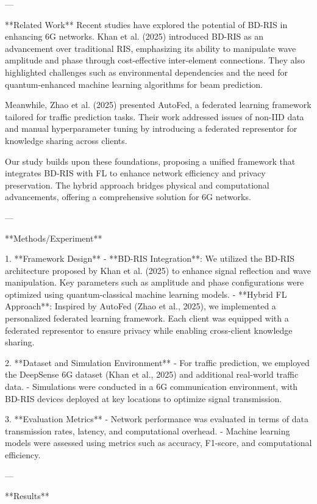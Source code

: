 ---

**Related Work**  
Recent studies have explored the potential of BD-RIS in enhancing 6G networks. Khan et al. (2025) introduced BD-RIS as an advancement over traditional RIS, emphasizing its ability to manipulate wave amplitude and phase through cost-effective inter-element connections. They also highlighted challenges such as environmental dependencies and the need for quantum-enhanced machine learning algorithms for beam prediction.  

Meanwhile, Zhao et al. (2025) presented AutoFed, a federated learning framework tailored for traffic prediction tasks. Their work addressed issues of non-IID data and manual hyperparameter tuning by introducing a federated representor for knowledge sharing across clients.  

Our study builds upon these foundations, proposing a unified framework that integrates BD-RIS with FL to enhance network efficiency and privacy preservation. The hybrid approach bridges physical and computational advancements, offering a comprehensive solution for 6G networks.  

---

**Methods/Experiment**  

1. **Framework Design**  
   - **BD-RIS Integration**: We utilized the BD-RIS architecture proposed by Khan et al. (2025) to enhance signal reflection and wave manipulation. Key parameters such as amplitude and phase configurations were optimized using quantum-classical machine learning models.  
   - **Hybrid FL Approach**: Inspired by AutoFed (Zhao et al., 2025), we implemented a personalized federated learning framework. Each client was equipped with a federated representor to ensure privacy while enabling cross-client knowledge sharing.  

2. **Dataset and Simulation Environment**  
   - For traffic prediction, we employed the DeepSense 6G dataset (Khan et al., 2025) and additional real-world traffic data.  
   - Simulations were conducted in a 6G communication environment, with BD-RIS devices deployed at key locations to optimize signal transmission.  

3. **Evaluation Metrics**  
   - Network performance was evaluated in terms of data transmission rates, latency, and computational overhead.  
   - Machine learning models were assessed using metrics such as accuracy, F1-score, and computational efficiency.  

---

**Results**  

